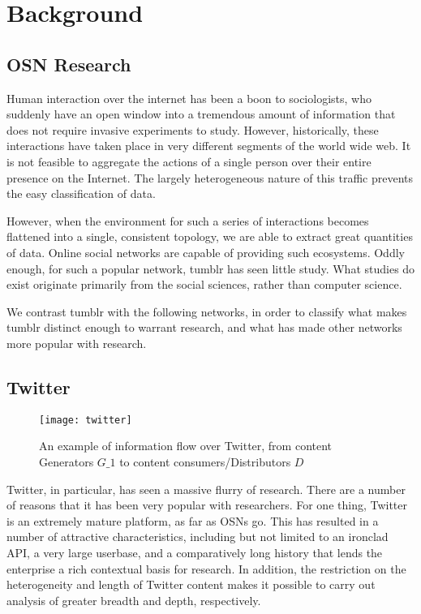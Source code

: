 \section{Background}
\label{sec:-back}
\subsection{OSN Research}
Human interaction over the internet has been a boon to sociologists, 
who suddenly have an open window into a tremendous amount of information 
that does not require invasive experiments to study.  However, 
historically, these interactions have taken place in very different 
segments of the world wide web.  It is not feasible to aggregate the 
actions of a single person over their entire presence on the Internet.  
The largely heterogeneous nature of this traffic prevents the easy 
classification of data.  

However, when the environment for such a series 
of interactions becomes flattened into a single, consistent topology, 
we are able to extract great quantities of data.  Online social 
networks are capable of providing such ecosystems.  Oddly enough, 
for such a popular network, tumblr has seen little study.  What studies 
do exist originate primarily from the social sciences, rather than computer 
science. 

 We contrast tumblr with the following networks, in order to classify 
what makes tumblr distinct enough to warrant research, and what has 
made other networks more popular with research.

\subsection{Twitter}
\begin{figure}[bht]
\centering
 \texttt{[image: twitter]}
 \caption{An example of information flow over Twitter, from content Generators \(G\_1\) to content consumers/Distributors \(D\)}
 \label{fig:twitter}
\end{figure}
Twitter, in particular, has seen a massive flurry of research.  There 
are a number of reasons that it has been very popular with researchers.  
For one thing, Twitter is an extremely mature platform, as far as OSNs 
go.  This has resulted in a number of attractive characteristics, 
including but not limited to an ironclad API, a very large userbase, 
and a comparatively long history that lends the enterprise a rich 
contextual basis for research.  In addition, the restriction on the 
heterogeneity and length of Twitter content makes it possible to carry 
out analysis of greater breadth and depth, respectively.


